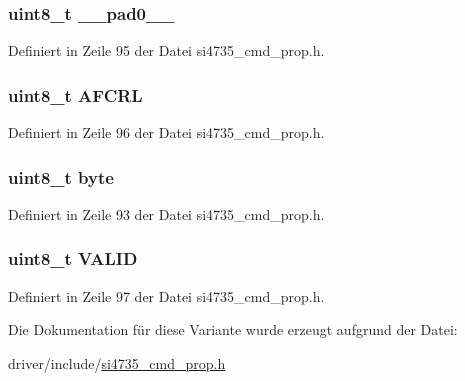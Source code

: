 \subsubsection[{\+\_\+\+\_\+pad0\+\_\+\+\_\+}]{\setlength{\rightskip}{0pt plus 5cm}uint8\+\_\+t \+\_\+\+\_\+pad0\+\_\+\+\_\+}\label{unionfm__tune__status__resp1_a8b4eebe79ded0459acec2f4950102ba3}


Definiert in Zeile 95 der Datei si4735\+\_\+cmd\+\_\+prop.\+h.

\hypertarget{unionfm__tune__status__resp1_aec3ecfbd976645f2d3d4067f32271635}{}
\subsubsection[{A\+F\+C\+R\+L}]{\setlength{\rightskip}{0pt plus 5cm}uint8\+\_\+t A\+F\+C\+R\+L}\label{unionfm__tune__status__resp1_aec3ecfbd976645f2d3d4067f32271635}


Definiert in Zeile 96 der Datei si4735\+\_\+cmd\+\_\+prop.\+h.

\hypertarget{unionfm__tune__status__resp1_a96f44d20f1dbf1c8785a7bc99a46164c}{}
\subsubsection[{byte}]{\setlength{\rightskip}{0pt plus 5cm}uint8\+\_\+t byte}\label{unionfm__tune__status__resp1_a96f44d20f1dbf1c8785a7bc99a46164c}


Definiert in Zeile 93 der Datei si4735\+\_\+cmd\+\_\+prop.\+h.

\hypertarget{unionfm__tune__status__resp1_a58bd81dc31c117b187f38fbc118b393e}{}
\subsubsection[{V\+A\+L\+I\+D}]{\setlength{\rightskip}{0pt plus 5cm}uint8\+\_\+t V\+A\+L\+I\+D}\label{unionfm__tune__status__resp1_a58bd81dc31c117b187f38fbc118b393e}


Definiert in Zeile 97 der Datei si4735\+\_\+cmd\+\_\+prop.\+h.



Die Dokumentation für diese Variante wurde erzeugt aufgrund der Datei\+:\begin{DoxyCompactItemize}
\item 
driver/include/\hyperlink{si4735__cmd__prop_8h}{si4735\+\_\+cmd\+\_\+prop.\+h}\end{DoxyCompactItemize}
